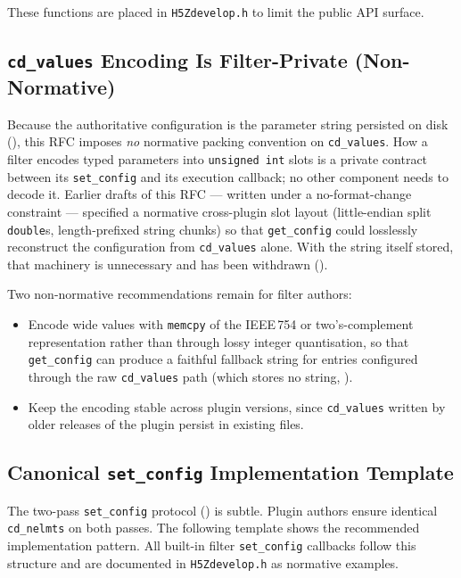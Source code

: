 \documentclass[../RFC-HDFG-2026-001.tex]{subfiles}
\begin{document}
These functions are placed in \texttt{H5Zdevelop.h} to limit the public API
surface.


\subsection{\texttt{cd\_values} Encoding Is Filter-Private (Non-Normative)}
\label{sec:cd-packing-convention}

Because the authoritative configuration is the parameter string persisted
on disk (), this RFC imposes \emph{no} normative
packing convention on \texttt{cd\_values}.  How a filter encodes typed
parameters into \texttt{unsigned int} slots is a private contract between
its \texttt{set\_config} and its execution callback; no other component
needs to decode it.  Earlier drafts of this RFC --- written under a
no-format-change constraint --- specified a normative cross-plugin slot
layout (little-endian split \texttt{double}s, length-prefixed string
chunks) so that \texttt{get\_config} could losslessly reconstruct the
configuration from \texttt{cd\_values} alone.  With the string itself
stored, that machinery is unnecessary and has been withdrawn
().

Two non-normative recommendations remain for filter authors:

\begin{itemize}
\item Encode wide values with \texttt{memcpy} of the IEEE\,754 or
  two's-complement representation rather than through lossy integer
  quantisation, so that \texttt{get\_config} can produce a faithful
  fallback string for entries configured through the raw
  \texttt{cd\_values} path (which stores no string,
  ).
\item Keep the encoding stable across plugin versions, since
  \texttt{cd\_values} written by older releases of the plugin persist in
  existing files.
\end{itemize}


\subsection{Canonical \texttt{set\_config} Implementation Template}
\label{sec:set-config-template}

The two-pass \texttt{set\_config} protocol () is
subtle. Plugin authors ensure identical \texttt{cd\_nelmts} on both passes.
The following template shows the recommended implementation pattern. All
built-in filter \texttt{set\_config} callbacks follow this structure and are
documented in \texttt{H5Zdevelop.h} as normative examples.
\end{document}
